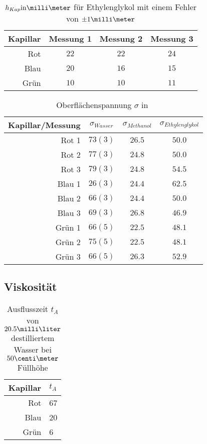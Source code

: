 \documentclass[12pt, a4paper, twoside]{scrartcl}
\begin{document}
\begin{table}
\centering
\begin{tabular}{r|c|c|c}
    Kapillar & Messung 1 & Messung 2 & Messung 3\\
    \hline
    Rot & $22$ & $22$ & $24$\\
    Blau & $20$ & $16$ & $15$ \\
    Grün & $10$ & $10$ & $11$\\
    
 \end{tabular} 
 \caption{\label{tab:h_kap_eth}$h_{Kap} \rm{in} \milli\meter$ für Ethylenglykol mit einem Fehler von $\pm 1\milli\meter$}
\end{table}

\begin{table}
\centering
\begin{tabular}{r|c|c|c}
    Kapillar/Messung & $\sigma _{Wasser}$ & $\sigma _{Methanol}$ & $\sigma _{Ethylenglykol}$\\
    \hline
    Rot 1 & $ 73(3)$ & $ 26.5$ & $ 50.0$\\
    Rot 2 & $ 77(3)$ & $ 24.8$ & $ 50.0$\\
    Rot 3 & $ 79(3)$ & $ 24.8$ & $ 54.5$ \\
    \hline
    Blau 1 & $ 26(3)$ & $ 24.4$ & $ 62.5$ \\
    Blau 2 & $ 66(3)$ & $ 24.4$ & $ 50.0$ \\
    Blau 3 & $ 69(3)$ & $ 26.8$ & $ 46.9$ \\
    \hline
    Grün 1 & $ 66(5)$ & $ 22.5$ & $ 48.1$ \\
    Grün 2 & $ 75(5)$ & $ 22.5$ & $ 48.1$ \\
    Grün 3 & $ 66(5)$ & $ 26.3$ & $ 52.9$ \\
    
 \end{tabular} 
 \caption{\label{tab:oberflaechenspannung}Oberflächenspannung $\sigma$ in $ $}
\end{table}


\subsection{Viskosität}


\begin{table}
\centering
\begin{tabular}{rl}
    Kapillar & $t_A$\\
    \hline
    Rot & 67\\
    Blau & 20 \\
    Grün & 6\\
    
 \end{tabular} \label{tab:t_A}
 \caption{Ausflusszeit $t_A$ von $20.5\milli\liter$ destilliertem Wasser bei $50\centi\meter$ Füllhöhe}
\end{table}
\end{document}

